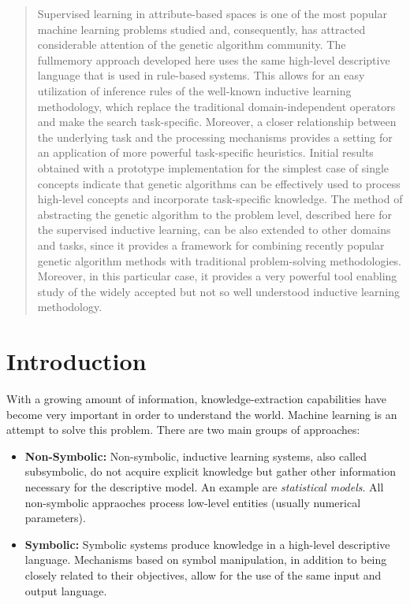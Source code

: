\documentclass[../main.tex]{subfiles}
\begin{document}
\begin{abstract}
Supervised learning in attribute-based spaces is one of the most popular machine learning problems studied and,
consequently, has attracted considerable attention of the genetic algorithm community. The fullmemory approach
developed here uses the same high-level descriptive language that is used in rule-based systems. This allows for an
easy utilization of inference rules of the well-known inductive learning methodology, which replace the traditional
domain-independent operators and make the search task-specific. Moreover, a closer relationship between the underlying
task and the processing mechanisms provides a setting for an application of more powerful task-specific heuristics.
Initial results obtained with a prototype implementation for the simplest case of single concepts indicate that genetic
algorithms can be effectively used to process high-level concepts and incorporate task-specific knowledge. The method
of abstracting the genetic algorithm to the problem level, described here for the supervised inductive learning, can be
also extended to other domains and tasks, since it provides a framework for combining recently popular genetic
algorithm methods with traditional problem-solving methodologies. Moreover, in this particular case, it provides a very
powerful tool enabling study of the widely accepted but not so well understood inductive learning methodology.
\end{abstract}

\begin{mdframed}
\end{mdframed}

\section{Introduction}

With a growing amount of information, knowledge-extraction capabilities have become very important in order to
understand the world. Machine learning is an attempt to solve this problem. There are two main groups of approaches:

\begin{itemize}
	\item \textbf{Non-Symbolic:} Non-symbolic, inductive learning systems, also called subsymbolic, do not acquire
	explicit knowledge but gather other information necessary for the descriptive model. An example are
	\emph{statistical models}. All non-symbolic appraoches process low-level entities (usually numerical parameters).
	\item \textbf{Symbolic:}  Symbolic systems produce knowledge in a high-level descriptive language. Mechanisms based
	on symbol manipulation, in addition to being closely related to their objectives, allow for the use of the same
	input and output language.
\end{itemize}
\end{document}
